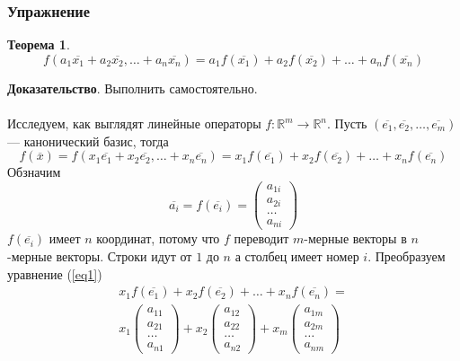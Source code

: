 \documentclass[]{article}
\newtheorem{theorem}{Теорема}
\begin{document}
	\subsubsection{Упражнение}
	\begin{theorem}
		\begin{equation}
			f(a_1\overline{x_1}+ a_2\overline{x_2},\ldots+ a_n\overline{x_n})
			=
			a_1f(\overline{x_1})+ a_2f(\overline{x_2})+\ldots+ a_nf(\overline{x_n})
		\end{equation}
	\end{theorem}
	\textbf{Доказательство}. Выполнить самостоятельно.
	\\
	\\
	Исследуем, как выглядят линейные операторы $f:\mathbb{R}^m\rightarrow\mathbb{R}^n$. Пусть $(\overline{e_1}, \overline{e_2}, \ldots, \overline{e_m})$ --- канонический базис, тогда 
		\begin{equation}\label{eq1}
			f(\overline{x})=
	f(x_1\overline{e_1}+ x_2\overline{e_2},\ldots+ x_n\overline{e_n})
	=
	x_1f(\overline{e_1})+ x_2f(\overline{e_2})+\ldots+ x_nf(\overline{e_n})
\end{equation}
	 Обзначим
	 \begin{equation}
	 	\overline{a_i}=
	 	f(\overline{e_i})=
	 	\begin{pmatrix}
	 		a_{1i}
	 		\\
	 		a_{2i}
	 		\\
	 		\ldots
	 		\\
			a_{ni}
	 	\end{pmatrix}
	 \end{equation}
	 $f(\overline{e_i})$ имеет $n$ координат, потому что $f$ переводит $m$-мерные векторы в $n$-мерные векторы. Строки идут от $1$ до $n$ а столбец имеет номер $i$. Преобразуем уравнение (\ref{eq1})
	 \begin{gather*}
	 	x_1f(\overline{e_1})+ x_2f(\overline{e_2})+\ldots+ x_nf(\overline{e_n})
	 	=
	 	\\
	 	x_1
	 	\begin{pmatrix}
	 		a_{11}
	 		\\
	 		a_{21}
	 		\\
	 		\ldots
	 		\\
	 		a_{n1}
	 	\end{pmatrix}
	 	+
	 	x_2
	 	\begin{pmatrix}
	 		a_{12}
	 		\\
	 		a_{22}
	 		\\
	 		\ldots
	 		\\
	 		a_{n2}
	 	\end{pmatrix}
	 	+
x_m
\begin{pmatrix}
	a_{1m}
	\\
	a_{2m}
	\\
	\ldots
	\\
	a_{nm}
\end{pmatrix}
	 \end{gather*}
\end{document}
